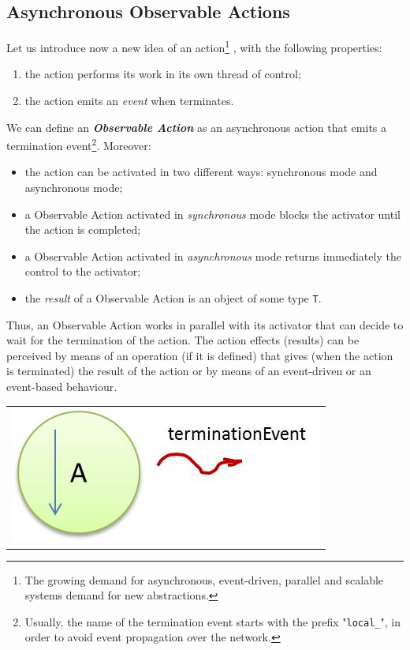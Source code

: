 \subsection{Asynchronous Observable Actions}

Let us introduce now a new idea of an action\footnote{The growing demand for asynchronous, event-driven, parallel and scalable systems demand for new abstractions.} , with the following properties:
\begin{enumerate}
\item the action performs its work in its own thread of control;
\item the action emits an \textit{event} when terminates.
\end{enumerate}

We can define an \textit{\textbf{Observable Action}} as an asynchronous action that emits a termination event\footnote{Usually, the name of the termination event starts with the prefix "\texttt{local\_}", in order to avoid event propagation over the network.}. Moreover:
\begin{itemize}
\item the action can be activated in two different ways: synchronous mode and asynchronous mode;
\item a Observable Action activated in  \textit{synchronous} mode blocks the activator until the action is completed;
\item a Observable Action activated in  \textit{asynchronous} mode returns immediately the control to the activator;
\item the \textit{result} of a Observable Action is an object of some type \texttt{T}.
\end{itemize}

Thus, an Observable Action works in parallel with its activator that can decide to wait for the termination of the action. The action effects (results) can be perceived by means of an operation (if it is defined) that gives (when the action is terminated) the result of the action or by means of an event-driven or an event-based behaviour.

\begin{center}
\begin{tabular}{ c }
     \includegraphics[scale = 0.5]{img/actionObservable.jpg}\\
\end{tabular}{   }
\end{center}
 

